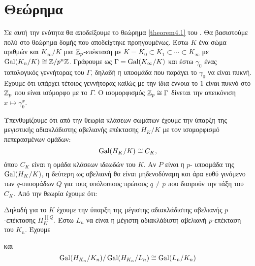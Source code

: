 \section{Θεώρημα }

Σε αυτή την ενότητα θα αποδείξουμε το θεώρημα \ref{theorem4.1} του . Θα βασιστούμε πολύ στο θεώρημα δομής που 
αποδείχτηκε προηγουμένως. Έστω $K$ ένα σώμα αριθμών και $K_\infty/K$ μια $\mathbb{Z}_p$-επέκταση με $K=K_0 \subset K_1 \subset \cdots \subset 
K_{\infty}$ με $\operatorname{Gal}(K_n/K) \cong \mathbb{Z}/p^n \mathbb{Z}$. Γράφουμε ως $\Gamma = \operatorname{Gal}(K_{\infty}/K)$ και έστω $\gamma_0$ ένας τοπολογικός γεννήτορας 
του $\Gamma$, δηλαδή η υποομάδα που παράγει το $\gamma_0$ να είναι πυκνή. Έχουμε ότι υπάρχει τέτοιος γεννήτορας καθώς με την ίδια 
έννοια το $1$ είναι πυκνό στο $\mathbb{Z}_p$ που είναι ισόμορφο με το $\Gamma$. Ο ισομορφισμός $\mathbb{Z}_p \cong \Gamma$ δίνεται την απεικόνιση $x\longmapsto \gamma_0^x$. 

Υπενθυμίζουμε ότι από την θεωρία κλάσεων σωμάτων έχουμε την ύπαρξη της μεγιστικής αδιακλάδιστης αβελιανής επέκτασης $H_K/K$ με τον ισομορφισμό πεπερασμένων ομάδων:
$$\operatorname{Gal}(H_K/K) \cong C_K,$$ όπου $C_K$ είναι η ομάδα κλάσεων ιδεωδών του $K$. Αν $P$ είναι η $p$- υποομάδα της $\operatorname{Gal}(H_K/K)$, η 
δεύτερη ως αβελιανή θα είναι μηδενοδύναμη και άρα ευθύ γινόμενο των  $q$-υποομάδων $Q$ για τους υπόλοιπους πρώτους $q\neq p$ 
που διαιρούν την τάξη του $C_K$. Από την θεωρία  έχουμε ότι:

\begin{figure}[H]
    \centering
\end{figure} 

\noindent Δηλαδή για το $K$ έχουμε την ύπαρξη της μέγιστης αδιακλάδιστης αβελιανής $p$-επέκτασης $H_K^{\prod Q}$. Έστω $L_n$ να είναι η μέγιστη αδιακλάδιστη αβελιανή $p$-επέκταση του $K_n$. Έχουμε 
\begin{figure}[H]
    \centering
\end{figure}
\noindent και
$$\operatorname{Gal}(H_{K_n}/K_n)/\operatorname{Gal}(H_{K_n}/L_n) \cong \operatorname{Gal}(L_n/K_n)$$

